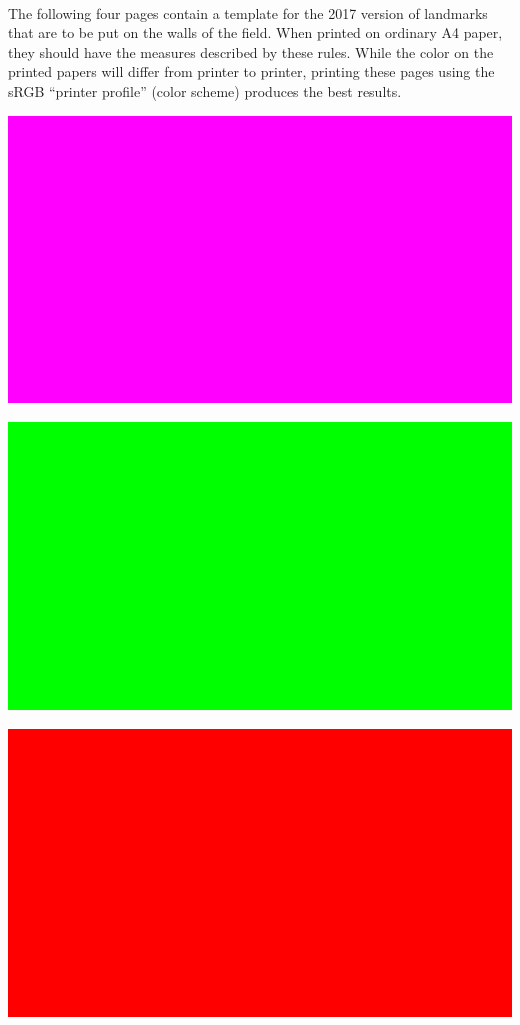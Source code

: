 \documentclass{article}
\newcommand*{\p}{\paragraph{}}
\begin{document}
\p The following four pages contain a template for the 2017 version
    of landmarks that are to be put on the walls of the field. When printed on
ordinary A4 paper, they should have the measures described by these rules.
While the color on the printed papers will differ from printer to printer,
printing these pages using the sRGB ``printer profile'' (color scheme) produces
the best results.

\newpage

\includegraphics[width=1\textwidth]{media/image11.png}

\includegraphics[width=1\textwidth]{media/image12.png}

\includegraphics[width=1\textwidth]{media/image13.png}
\end{document}
